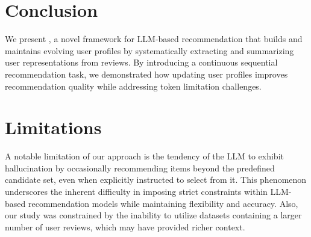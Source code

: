 \vspace*{-0.1cm}
\section{Conclusion}
\vspace*{-0.1cm}
 We present \myalg{}, a novel framework for LLM-based recommendation that builds and maintains evolving user profiles by systematically extracting and summarizing user representations from reviews. By introducing a continuous sequential recommendation task, we demonstrated how updating user profiles improves recommendation quality while addressing token limitation challenges.
 

\section{Limitations} 
A notable limitation of our approach is the tendency of the LLM to exhibit hallucination by occasionally recommending items beyond the predefined candidate set, even when explicitly instructed to select from it. This phenomenon underscores the inherent difficulty in imposing strict constraints within LLM-based recommendation models while maintaining flexibility and accuracy. Also, our study was constrained by the inability to utilize datasets containing a larger number of user reviews, which may have provided richer context.


